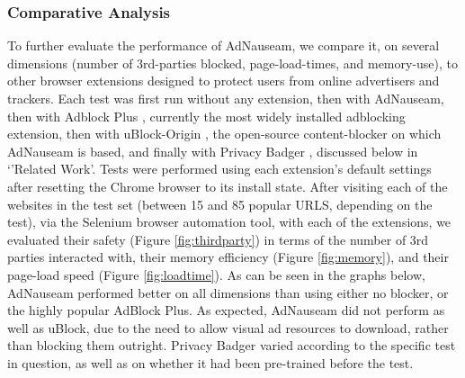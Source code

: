 \documentclass[conference]{IEEEtran}
\begin{document}
%

\subsubsection{Comparative Analysis}

To further evaluate the performance of AdNauseam, we compare it, on several dimensions (number of 3rd-parties blocked, page-load-times, and memory-use), to other browser extensions designed to protect users from online advertisers and trackers. Each test was first run without any extension, then with AdNauseam, then with Adblock Plus \cite{AdBlock}, currently the most widely installed adblocking extension, then with uBlock-Origin \cite{Gorhill}, the open-source content-blocker on which AdNauseam is based, and finally with Privacy Badger \cite{EFF}, discussed below in `'Related Work'. Tests were performed using each extension's default settings after resetting the Chrome browser to its install state. After visiting each of the websites in the test set (between 15 and 85 popular URLS, depending on the test), via the Selenium browser automation tool, with each of the extensions, we evaluated their safety (Figure \ref{fig:thirdparty}) in terms of the number of 3rd parties interacted with, their memory efficiency (Figure \ref{fig:memory}), and their page-load speed (Figure \ref{fig:loadtime}). As can be seen in the graphs below, AdNauseam performed better on all dimensions than using either no blocker, or the highly popular AdBlock Plus. As expected, AdNauseam did not perform as well as uBlock, due to the need to allow visual ad resources to download, rather than blocking them outright. Privacy Badger varied according to the specific test in question, as well as on whether it had been pre-trained before the test.
\end{document}
